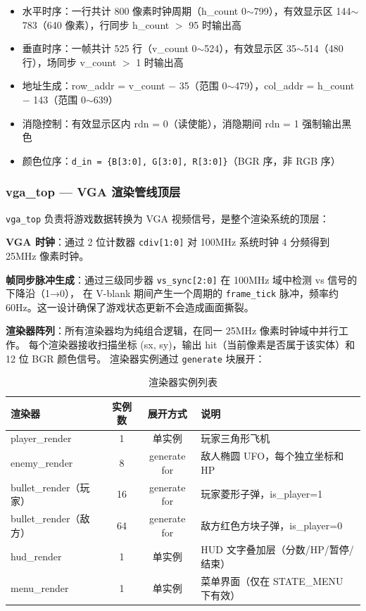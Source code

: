 \documentclass[12pt,a4paper]{ctexart}
\begin{document}
\begin{itemize}
    \item 水平时序：一行共计 800 像素时钟周期（h\_count 0$\sim$799），有效显示区 144$\sim$783（640 像素），行同步 h\_count $>$ 95 时输出高
    \item 垂直时序：一帧共计 525 行（v\_count 0$\sim$524），有效显示区 35$\sim$514（480 行），场同步 v\_count $>$ 1 时输出高
    \item 地址生成：row\_addr = v\_count $-$ 35（范围 0$\sim$479），col\_addr = h\_count $-$ 143（范围 0$\sim$639）
    \item 消隐控制：有效显示区内 rdn = 0（读使能），消隐期间 rdn = 1 强制输出黑色
    \item 颜色位序：\texttt{d\_in = \{B[3:0], G[3:0], R[3:0]\}}（BGR 序，非 RGB 序）
\end{itemize}

\subsubsection{vga\_top --- VGA 渲染管线顶层}

\texttt{vga\_top} 负责将游戏数据转换为 VGA 视频信号，是整个渲染系统的顶层：

\textbf{VGA 时钟}：通过 2 位计数器 \texttt{cdiv[1:0]} 对 100MHz 系统时钟 4 分频得到 25MHz 像素时钟。

\textbf{帧同步脉冲生成}：通过三级同步器 \texttt{vs\_sync[2:0]} 在 100MHz 域中检测 vs 信号的下降沿（1→0），
在 V-blank 期间产生一个周期的 \texttt{frame\_tick} 脉冲，频率约 60Hz。这一设计确保了游戏状态更新不会造成画面撕裂。

\textbf{渲染器阵列}：所有渲染器均为纯组合逻辑，在同一 25MHz 像素时钟域中并行工作。
每个渲染器接收扫描坐标 (sx, sy)，输出 hit（当前像素是否属于该实体）和 12 位 BGR 颜色信号。
渲染器实例通过 \texttt{generate} 块展开：

\begin{table}[H]
\centering
\caption{渲染器实例列表}
\label{tab:renderers}
\begin{tabular}{lccp{4cm}}
\toprule
\textbf{渲染器} & \textbf{实例数} & \textbf{展开方式} & \textbf{说明} \\
\midrule
player\_render & 1 & 单实例 & 玩家三角形飞机 \\
enemy\_render & 8 & generate for & 敌人椭圆 UFO，每个独立坐标和 HP \\
bullet\_render（玩家） & 16 & generate for & 玩家菱形子弹，is\_player=1 \\
bullet\_render（敌方） & 64 & generate for & 敌方红色方块子弹，is\_player=0 \\
hud\_render & 1 & 单实例 & HUD 文字叠加层（分数/HP/暂停/结束） \\
menu\_render & 1 & 单实例 & 菜单界面（仅在 STATE\_MENU 下有效） \\
\bottomrule
\end{tabular}
\end{table}
\end{document}
